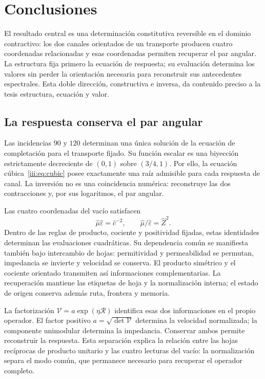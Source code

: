\section{Conclusiones}
\label{iii:sec:conclusiones}
\begingroup
\fontsize{10.5}{12.8}\selectfont
\setlength{\parskip}{2pt plus .5pt minus .5pt}

El resultado central es una determinación constitutiva reversible en
el dominio contractivo: los dos canales orientados de un transporte
producen cuatro coordenadas relacionadas y esas coordenadas permiten
recuperar el par angular. La estructura fija primero la ecuación de
respuesta; su evaluación determina los valores sin perder la orientación
necesaria para reconstruir sus antecedentes espectrales. Esta doble
dirección, constructiva e inversa, da contenido preciso a la tesis
estructura, ecuación y valor.

\subsection*{La respuesta conserva el par angular}

Las incidencias $90$ y $120$ determinan una única solución de la
ecuación de completación para el transporte fijado. Su función escalar
es una biyección estrictamente decreciente de $(0,1)$ sobre $(3/4,1)$.
Por ello, la ecuación cúbica~\eqref{iii:eq:cubic} posee exactamente
una raíz admisible para cada respuesta de canal. La inversión no es
una coincidencia numérica: reconstruye las dos contracciones y, por
sus logaritmos, el par angular.

Las cuatro coordenadas del vacío satisfacen
\[
\widehat\mu\widehat\varepsilon=\widehat c^{-2},\qquad
\widehat\mu/\widehat\varepsilon=\widehat Z^2.
\]
Dentro de las reglas de producto, cociente y positividad fijadas, estas
identidades determinan las evaluaciones cuadráticas. Su dependencia
común se manifiesta también bajo intercambio de hojas: permitividad y
permeabilidad se permutan, impedancia se invierte y velocidad se
conserva. El producto simétrico y el cociente orientado transmiten así
informaciones complementarias. La recuperación mantiene las etiquetas
de hoja y la normalización interna; el estado de origen conserva
además ruta, frontera y memoria.

La factorización $\mathcal V=a\exp(\eta\mathcal R)$ identifica
esas dos informaciones en el propio operador. El factor positivo
$a=\sqrt{\det\mathcal V}$ determina la velocidad normalizada;
la componente unimodular determina la impedancia. Conservar ambos
permite reconstruir la respuesta. Esta separación explica la relación
entre las hojas recíprocas de producto unitario y las cuatro lecturas
del vacío: la normalización separa el modo común, que permanece
necesario para recuperar el operador completo.

